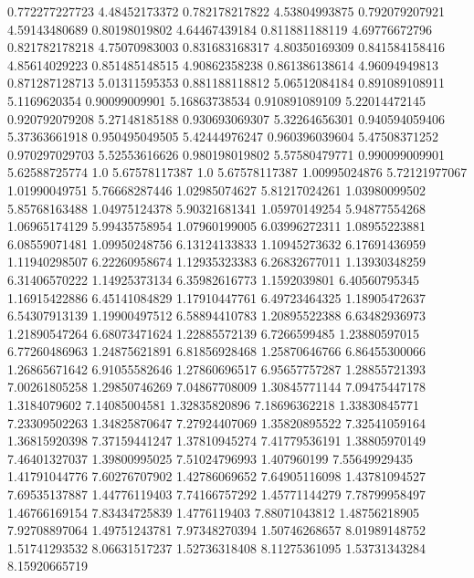  0.772277227723    4.48452173372
 0.782178217822    4.53804993875
 0.792079207921    4.59143480689
  0.80198019802    4.64467439184
 0.811881188119    4.69776672796
 0.821782178218    4.75070983003
 0.831683168317    4.80350169309
 0.841584158416    4.85614029223
 0.851485148515    4.90862358238
 0.861386138614    4.96094949813
 0.871287128713    5.01311595353
 0.881188118812    5.06512084184
 0.891089108911     5.1169620354
  0.90099009901    5.16863738534
 0.910891089109    5.22014472145
 0.920792079208    5.27148185188
 0.930693069307    5.32264656301
 0.940594059406    5.37363661918
 0.950495049505    5.42444976247
 0.960396039604    5.47508371252
 0.970297029703    5.52553616626
 0.980198019802    5.57580479771
 0.990099009901    5.62588725774
            1.0    5.67578117387
            1.0    5.67578117387
  1.00995024876    5.72121977067
  1.01990049751    5.76668287446
  1.02985074627    5.81217024261
  1.03980099502    5.85768163488
  1.04975124378    5.90321681341
  1.05970149254    5.94877554268
  1.06965174129    5.99435758954
  1.07960199005    6.03996272311
  1.08955223881    6.08559071481
  1.09950248756    6.13124133833
  1.10945273632    6.17691436959
  1.11940298507    6.22260958674
  1.12935323383    6.26832677011
  1.13930348259    6.31406570222
  1.14925373134    6.35982616773
   1.1592039801    6.40560795345
  1.16915422886    6.45141084829
  1.17910447761    6.49723464325
  1.18905472637    6.54307913139
  1.19900497512    6.58894410783
  1.20895522388    6.63482936973
  1.21890547264    6.68073471624
  1.22885572139     6.7266599485
  1.23880597015    6.77260486963
  1.24875621891    6.81856928468
  1.25870646766    6.86455300066
  1.26865671642    6.91055582646
  1.27860696517    6.95657757287
  1.28855721393    7.00261805258
  1.29850746269    7.04867708009
  1.30845771144    7.09475447178
   1.3184079602    7.14085004581
  1.32835820896    7.18696362218
  1.33830845771    7.23309502263
  1.34825870647    7.27924407069
  1.35820895522    7.32541059164
  1.36815920398    7.37159441247
  1.37810945274    7.41779536191
  1.38805970149    7.46401327037
  1.39800995025    7.51024796993
    1.407960199    7.55649929435
  1.41791044776    7.60276707902
  1.42786069652    7.64905116098
  1.43781094527    7.69535137887
  1.44776119403    7.74166757292
  1.45771144279    7.78799958497
  1.46766169154    7.83434725839
   1.4776119403    7.88071043812
  1.48756218905    7.92708897064
  1.49751243781    7.97348270394
  1.50746268657    8.01989148752
  1.51741293532    8.06631517237
  1.52736318408    8.11275361095
  1.53731343284    8.15920665719
